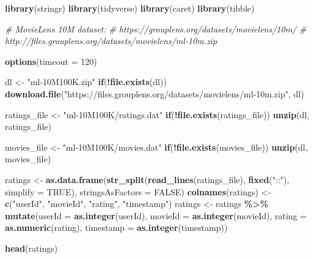 \documentclass[
]{article}
\newenvironment{Shaded}{\begin{snugshade}}{\end{snugshade}}
\newcommand{\AttributeTok}[1]{\textcolor[rgb]{0.13,0.29,0.53}{#1}}
\newcommand{\CommentTok}[1]{\textcolor[rgb]{0.56,0.35,0.01}{\textit{#1}}}
\newcommand{\ConstantTok}[1]{\textcolor[rgb]{0.56,0.35,0.01}{#1}}
\newcommand{\ControlFlowTok}[1]{\textcolor[rgb]{0.13,0.29,0.53}{\textbf{#1}}}
\newcommand{\DecValTok}[1]{\textcolor[rgb]{0.00,0.00,0.81}{#1}}
\newcommand{\FunctionTok}[1]{\textcolor[rgb]{0.13,0.29,0.53}{\textbf{#1}}}
\newcommand{\NormalTok}[1]{#1}
\newcommand{\OtherTok}[1]{\textcolor[rgb]{0.56,0.35,0.01}{#1}}
\newcommand{\SpecialCharTok}[1]{\textcolor[rgb]{0.81,0.36,0.00}{\textbf{#1}}}
\newcommand{\StringTok}[1]{\textcolor[rgb]{0.31,0.60,0.02}{#1}}
\begin{document}
\begin{Shaded}
\begin{Highlighting}[]
\FunctionTok{library}\NormalTok{(stringr)}
\FunctionTok{library}\NormalTok{(tidyverse)}
\FunctionTok{library}\NormalTok{(caret)}
\FunctionTok{library}\NormalTok{(tibble)}


\CommentTok{\# MovieLens 10M dataset:}
\CommentTok{\# https://grouplens.org/datasets/movielens/10m/}
\CommentTok{\# http://files.grouplens.org/datasets/movielens/ml{-}10m.zip}

\FunctionTok{options}\NormalTok{(}\AttributeTok{timeout =} \DecValTok{120}\NormalTok{)}

\NormalTok{dl }\OtherTok{\textless{}{-}} \StringTok{"ml{-}10M100K.zip"}
\ControlFlowTok{if}\NormalTok{(}\SpecialCharTok{!}\FunctionTok{file.exists}\NormalTok{(dl))}
  \FunctionTok{download.file}\NormalTok{(}\StringTok{"https://files.grouplens.org/datasets/movielens/ml{-}10m.zip"}\NormalTok{, dl)}

\NormalTok{ratings\_file }\OtherTok{\textless{}{-}} \StringTok{"ml{-}10M100K/ratings.dat"}
\ControlFlowTok{if}\NormalTok{(}\SpecialCharTok{!}\FunctionTok{file.exists}\NormalTok{(ratings\_file))}
  \FunctionTok{unzip}\NormalTok{(dl, ratings\_file)}

\NormalTok{movies\_file }\OtherTok{\textless{}{-}} \StringTok{"ml{-}10M100K/movies.dat"}
\ControlFlowTok{if}\NormalTok{(}\SpecialCharTok{!}\FunctionTok{file.exists}\NormalTok{(movies\_file))}
  \FunctionTok{unzip}\NormalTok{(dl, movies\_file)}


\NormalTok{ratings }\OtherTok{\textless{}{-}} \FunctionTok{as.data.frame}\NormalTok{(}\FunctionTok{str\_split}\NormalTok{(}\FunctionTok{read\_lines}\NormalTok{(ratings\_file), }\FunctionTok{fixed}\NormalTok{(}\StringTok{"::"}\NormalTok{), }\AttributeTok{simplify =} \ConstantTok{TRUE}\NormalTok{),}
                         \AttributeTok{stringsAsFactors =} \ConstantTok{FALSE}\NormalTok{)}
\FunctionTok{colnames}\NormalTok{(ratings) }\OtherTok{\textless{}{-}} \FunctionTok{c}\NormalTok{(}\StringTok{"userId"}\NormalTok{, }\StringTok{"movieId"}\NormalTok{, }\StringTok{"rating"}\NormalTok{, }\StringTok{"timestamp"}\NormalTok{)}
\NormalTok{ratings }\OtherTok{\textless{}{-}}\NormalTok{ ratings }\SpecialCharTok{\%\textgreater{}\%}
  \FunctionTok{mutate}\NormalTok{(}\AttributeTok{userId =} \FunctionTok{as.integer}\NormalTok{(userId),}
         \AttributeTok{movieId =} \FunctionTok{as.integer}\NormalTok{(movieId),}
         \AttributeTok{rating =} \FunctionTok{as.numeric}\NormalTok{(rating),}
         \AttributeTok{timestamp =} \FunctionTok{as.integer}\NormalTok{(timestamp))}

\FunctionTok{head}\NormalTok{(ratings)}
\end{Highlighting}
\end{Shaded}
\end{document}
